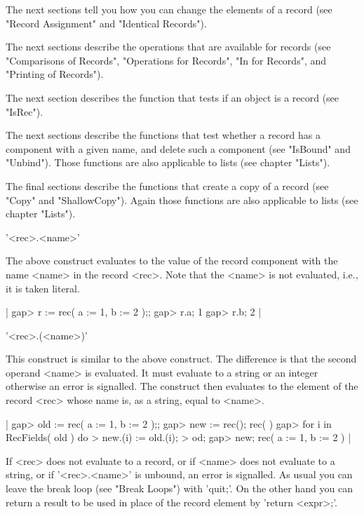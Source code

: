 The  next sections tell you  how you can  change the elements of a record
(see "Record Assignment" and "Identical Records").

The next sections describe the operations that  are available for records
(see   "Comparisons  of   Records", "Operations for    Records",  "In for
Records", and "Printing of Records").

The next  section  describes the function that   tests if an  object is a
record (see "IsRec").

The next sections describe the functions that test whether a record has a
component with  a given name, and  delete such a component (see "IsBound"
and "Unbind").  Those functions are also applicable to lists (see chapter
"Lists").

The final sections describe the functions that create a  copy of a record
(see "Copy" and      "ShallowCopy").  Again those  functions    are  also
applicable to lists (see chapter "Lists").

%

'<rec>.<name>'

The  above construct  evaluates to the value of the record component with
the name  <name>  in the  record <rec>.   Note  that  the <name>  is  not
evaluated, i.e., it is taken literal.

|    gap> r := rec( a := 1, b := 2 );;
    gap> r.a;
    1
    gap> r.b;
    2 |

'<rec>.(<name>)'

This construct is similar to the above construct.  The difference is that
the second  operand <name> is evaluated.  It must evaluate to a string or
an integer otherwise an error is signalled.  The construct then evaluates
to the element  of the  record <rec> whose name is, as a string, equal to
<name>.

|    gap> old := rec( a := 1, b := 2 );;
    gap> new := rec();
    rec(
       )
    gap> for i  in RecFields( old )  do
    >        new.(i) := old.(i);
    >    od;
    gap> new;
    rec(
      a := 1,
      b := 2 ) |

If <rec> does not evaluate to a record, or if <name> does not evaluate to
a  string, or if  '<rec>.<name>' is unbound,  an  error is signalled.  As
usual you can leave the break loop (see "Break  Loops") with 'quit;'.  On
the other hand you can return a result to be  used in place of the record
element by 'return <expr>;'.

